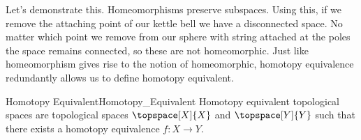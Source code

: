\documentclass{book}                                                           %
\begin{document}
                \hfill
                \par\vspace{2.5ex}
                \hfill
                \begin{minipage}{0.54\textwidth}
                    Let's demonstrate this. Homeomorphisms preserve subspaces.
                    Using this, if we remove the attaching point of our kettle
                    bell we have a disconnected space. No matter which point we
                    remove from our sphere with string attached at the poles the
                    space remains connected, so these are not homeomorphic.
                    Just like homeomorphism gives rise to the notion of
                    homeomorphic, homotopy equivalence redundantly allows us to
                    define homotopy equivalent.
                \end{minipage}
                \par\hfill\par
                \begin{fdefinition}{Homotopy Equivalent}{Homotopy_Equivalent}
                    Homotopy equivalent topological spaces are topological
                    spaces $\topspace[X]{X}$ and $\topspace[Y]{Y}$ such that
                    there exists a homotopy equivalence $f:X\rightarrow{Y}$.
                \end{fdefinition}
\end{document}
